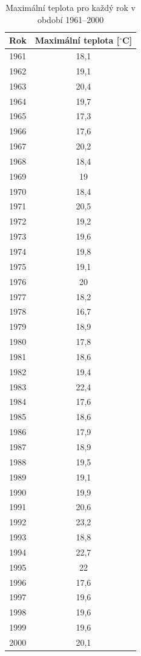 \documentclass{article}
\newcommand{\Celsius}{$^\circ$C}
\begin{document}
 
 \begin{table}[p]\centering \renewcommand{\arraystretch}{1.2}
	\caption{Maximální teplota pro každý rok v období 1961--2000}
	\begin{tabular}{cc}\toprule
		 Rok & \multicolumn{1}{c}{Maximální teplota [\Celsius]} \\ \midrule
		 1961   &  18,1 \\ 
		 1962   &  19,1 \\ 
		 1963   &  20,4 \\ 
		 1964   &  19,7 \\ 
		 1965   &  17,3 \\ 
		 1966   &  17,6 \\ 
		 1967   &  20,2 \\ 
		 1968   &  18,4 \\ 
		 1969   &  19   \\  
		 1970   &  18,4 \\ 
		 1971   &  20,5 \\ 
		 1972   &  19,2 \\ 
		 1973   &  19,6 \\ 
		 1974   &  19,8 \\ 
		 1975   &  19,1 \\ 
		 1976   &  20   \\  
		 1977   &  18,2 \\ 
		 1978   &  16,7 \\ 
		 1979   &  18,9 \\ 
		 1980   &  17,8 \\ 
		 1981   &  18,6 \\ 
		 1982   &  19,4 \\ 
		 1983   &  22,4 \\ 
		 1984   &  17,6 \\ 
		 1985   &  18,6 \\ 
		 1986   &  17,9 \\ 
		 1987   &  18,9 \\ 
		 1988   &  19,5 \\ 
		 1989   &  19,1 \\ 
		 1990   &  19,9 \\ 
		 1991   &  20,6 \\ 
		 1992   &  23,2 \\ 
		 1993   &  18,8 \\ 
		 1994   &  22,7 \\ 
		 1995   &  22   \\  
		 1996   &  17,6 \\ 
		 1997   &  19,6 \\ 
		 1998   &  19,6 \\ 
		 1999   &  19,6 \\ 
		 2000   &  20,1 \\ 
		\bottomrule
	\end{tabular} 
	\label{fig:tab1}
\end{table}
	
\end{document}
